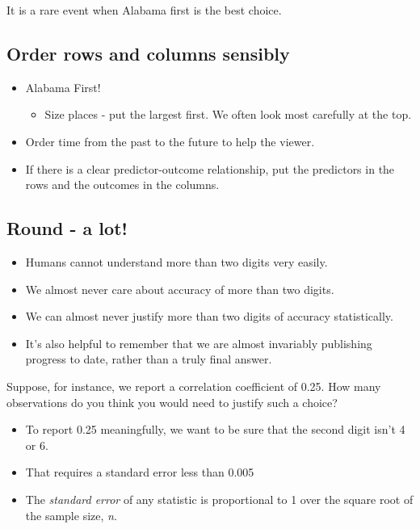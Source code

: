 \documentclass[
]{book}
\providecommand{\tightlist}{%
  \setlength{\itemsep}{0pt}\setlength{\parskip}{0pt}}
\begin{document}
It is a rare event when Alabama first is the best choice.

\hypertarget{order-rows-and-columns-sensibly}{%
\subsection{Order rows and columns sensibly}\label{order-rows-and-columns-sensibly}}

\begin{itemize}
\tightlist
\item
  Alabama First!

  \begin{itemize}
  \tightlist
  \item
    Size places - put the largest first. We often look most carefully at the top.
  \end{itemize}
\item
  Order time from the past to the future to help the viewer.
\item
  If there is a clear predictor-outcome relationship, put the predictors in the rows and the outcomes in the columns.
\end{itemize}

\hypertarget{round---a-lot}{%
\subsection{Round - a lot!}\label{round---a-lot}}

\begin{itemize}
\tightlist
\item
  Humans cannot understand more than two digits very easily.
\item
  We almost never care about accuracy of more than two digits.
\item
  We can almost never justify more than two digits of accuracy statistically.
\item
  It's also helpful to remember that we are almost invariably publishing progress to date, rather than a truly final answer.
\end{itemize}

Suppose, for instance, we report a correlation coefficient of 0.25. How many observations do you think you would need to justify such a choice?

\begin{itemize}
\tightlist
\item
  To report 0.25 meaningfully, we want to be sure that the second digit isn't 4 or 6.
\item
  That requires a standard error less than 0.005
\item
  The \emph{standard error} of any statistic is proportional to 1 over the square root of the sample size, \emph{n}.
\end{itemize}
\end{document}
